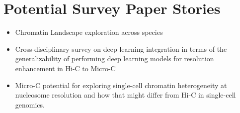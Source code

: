 \section{Potential Survey Paper Stories}
\begin{itemize}
    \item Chromatin Landscape exploration across species
    \item Cross-disciplinary survey on deep learning integration in terms of the generalizability of performing deep learning models for resolution enhancement in Hi-C to Micro-C
    \item Micro-C potential for exploring single-cell chromatin heterogeneity at nucleosome resolution and how that might differ from Hi-C in single-cell genomics.

\end{itemize}

\nocite{*}

